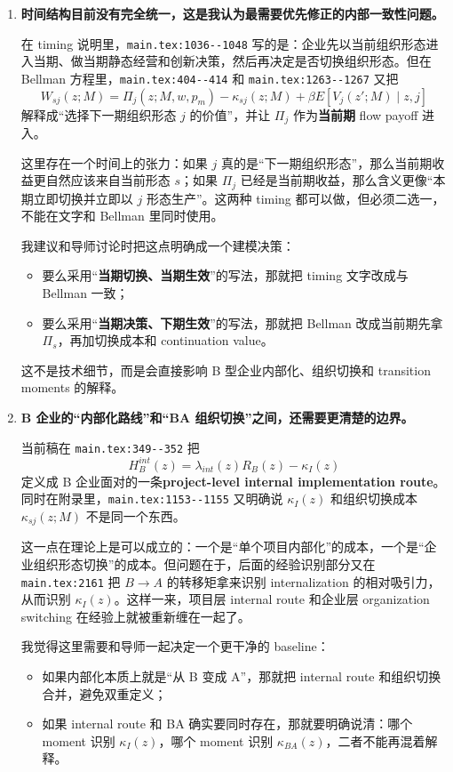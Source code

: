 \documentclass[12pt]{ctexart}
\newcommand{\fileref}[1]{\nolinkurl{#1}}
\begin{document}
\begin{enumerate}
\item \textbf{时间结构目前没有完全统一，这是我认为最需要优先修正的内部一致性问题。}

在 timing 说明里，\fileref{main.tex:1036--1048} 写的是：企业先以当前组织形态进入当期、做当期静态经营和创新决策，然后再决定是否切换组织形态。但在 Bellman 方程里，\fileref{main.tex:404--414} 和 \fileref{main.tex:1263--1267} 又把
\[
W_{sj}(z;M)=\Pi_j(z;M,w,p_m)-\kappa_{sj}(z;M)+\beta E[V_j(z' ;M)\mid z,j]
\]
解释成“选择下一期组织形态 $j$ 的价值”，并让 $\Pi_j$ 作为\textbf{当前期} flow payoff 进入。

这里存在一个时间上的张力：如果 $j$ 真的是“下一期组织形态”，那么当前期收益更自然应该来自当前形态 $s$；如果 $\Pi_j$ 已经是当前期收益，那么含义更像“本期立即切换并立即以 $j$ 形态生产”。这两种 timing 都可以做，但必须二选一，不能在文字和 Bellman 里同时使用。

我建议和导师讨论时把这点明确成一个建模决策：
\begin{itemize}
\item 要么采用“\textbf{当期切换、当期生效}”的写法，那就把 timing 文字改成与 Bellman 一致；
\item 要么采用“\textbf{当期决策、下期生效}”的写法，那就把 Bellman 改成当前期先拿 $\Pi_s$，再加切换成本和 continuation value。
\end{itemize}

这不是技术细节，而是会直接影响 B 型企业内部化、组织切换和 transition moments 的解释。

\item \textbf{B 企业的“内部化路线”和“B\textrightarrow A 组织切换”之间，还需要更清楚的边界。}

当前稿在 \fileref{main.tex:349--352} 把
\[
H_B^{int}(z)=\lambda_{int}(z)R_B(z)-\kappa_I(z)
\]
定义成 B 企业面对的一条\textbf{project-level internal implementation route}。同时在附录里，\fileref{main.tex:1153--1155} 又明确说 $\kappa_I(z)$ 和组织切换成本 $\kappa_{sj}(z;M)$ 不是同一个东西。

这一点在理论上是可以成立的：一个是“单个项目内部化”的成本，一个是“企业组织形态切换”的成本。但问题在于，后面的经验识别部分又在 \fileref{main.tex:2161} 把 $B\rightarrow A$ 的转移矩拿来识别 internalization 的相对吸引力，从而识别 $\kappa_I(z)$。这样一来，项目层 internal route 和企业层 organization switching 在经验上就被重新缠在一起了。

我觉得这里需要和导师一起决定一个更干净的 baseline：
\begin{itemize}
\item 如果内部化本质上就是“从 B 变成 A”，那就把 internal route 和组织切换合并，避免双重定义；
\item 如果 internal route 和 B\textrightarrow A 确实要同时存在，那就要明确说清：哪个 moment 识别 $\kappa_I(z)$，哪个 moment 识别 $\kappa_{BA}(z)$，二者不能再混着解释。
\end{itemize}


\end{enumerate}
\end{document}

